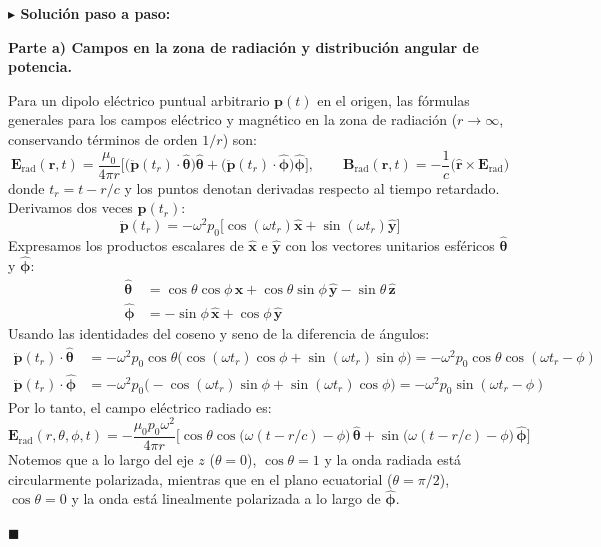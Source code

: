 \documentclass[11pt,a4paper]{book}
\newenvironment{solucion}{%
    \par\medskip\noindent\textbf{\color{blue!65!black}\Large $\blacktriangleright$ Solución paso a paso:}\par\medskip
}{%
    \hfill$\blacksquare$\par\bigskip
}
\newcommand{\rhat}{\hat{\bm{r}}}
\newcommand{\thetahat}{\hat{\bm{\theta}}}
\newcommand{\phihat}{\hat{\bm{\phi}}}
\newcommand{\xhat}{\hat{\bm{x}}}
\newcommand{\yhat}{\hat{\bm{y}}}
\newcommand{\zhat}{\hat{\bm{z}}}
\newcommand{\Evec}{\bm{E}}
\newcommand{\Bvec}{\bm{B}}
\begin{document}
\begin{solucion}
\textbf{Parte a) Campos en la zona de radiación y distribución angular de potencia.}

Para un dipolo eléctrico puntual arbitrario $\bm{p}(t)$ en el origen, las fórmulas generales para los campos eléctrico y magnético en la zona de radiación ($r \to \infty$, conservando términos de orden $1/r$) son:
\begin{equation}
    \Evec_{\text{rad}}(\bm{r},t) = \frac{\mu_0}{4\pi r} \Big[ \big(\ddot{\bm{p}}(t_r) \cdot \thetahat\big)\thetahat + \big(\ddot{\bm{p}}(t_r) \cdot \phihat\big)\phihat \Big], \qquad \Bvec_{\text{rad}}(\bm{r},t) = -\frac{1}{c}\big(\rhat \times \Evec_{\text{rad}}\big)
\end{equation}
donde $t_r = t - r/c$ y los puntos denotan derivadas respecto al tiempo retardado. Derivamos dos veces $\bm{p}(t_r)$:
\begin{equation}
    \ddot{\bm{p}}(t_r) = -\omega^2 p_0 \big[ \cos(\omega t_r)\xhat + \sin(\omega t_r)\yhat \big]
\end{equation}
Expresamos los productos escalares de $\xhat$ e $\yhat$ con los vectores unitarios esféricos $\thetahat$ y $\phihat$:
\begin{align}
    \thetahat &= \cos\theta\cos\phi\,\xhat + \cos\theta\sin\phi\,\yhat - \sin\theta\,\zhat \\
    \phihat &= -\sin\phi\,\xhat + \cos\phi\,\yhat
\end{align}
Usando las identidades del coseno y seno de la diferencia de ángulos:
\begin{align}
    \ddot{\bm{p}}(t_r) \cdot \thetahat &= -\omega^2 p_0 \cos\theta \big(\cos(\omega t_r)\cos\phi + \sin(\omega t_r)\sin\phi\big) = -\omega^2 p_0 \cos\theta \cos(\omega t_r - \phi) \\
    \ddot{\bm{p}}(t_r) \cdot \phihat &= -\omega^2 p_0 \big(-\cos(\omega t_r)\sin\phi + \sin(\omega t_r)\cos\phi\big) = -\omega^2 p_0 \sin(\omega t_r - \phi)
\end{align}
Por lo tanto, el campo eléctrico radiado es:
\begin{equation}
    \Evec_{\text{rad}}(r,\theta,\phi,t) = -\frac{\mu_0 p_0 \omega^2}{4\pi r} \Big[ \cos\theta \cos\big(\omega(t - r/c) - \phi\big)\,\thetahat + \sin\big(\omega(t - r/c) - \phi\big)\,\phihat \Big]
\end{equation}
Notemos que a lo largo del eje $z$ ($\theta = 0$), $\cos\theta = 1$ y la onda radiada está circularmente polarizada, mientras que en el plano ecuatorial ($\theta = \pi/2$), $\cos\theta = 0$ y la onda está linealmente polarizada a lo largo de $\phihat$.


\end{solucion}
\end{document}
